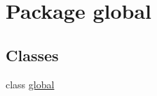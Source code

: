 \hypertarget{namespaceglobal}{}\section{Package global}
\label{namespaceglobal}
\subsection*{Classes}
\begin{DoxyCompactItemize}
\item 
class \hyperlink{classglobal_1_1global}{global}
\end{DoxyCompactItemize}
